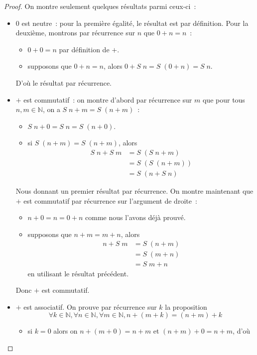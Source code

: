 \begin{proof}
  On montre seulement quelques résultats parmi ceux-ci~:
  \begin{itemize}
  \item $0$ est neutre~: pour la première égalité, le résultat est par
    définition. Pour la deuxième, montrons par récurrence sur $n$ que
    $0+n = n$~:
    \begin{itemize}
    \item $0 + 0 = n$ par définition de $+$.
    \item supposons que $0+n = n$, alors $0+S\;n = S\;(0+n) = S\;n$.
    \end{itemize}
    D'où le résultat par récurrence.
  \item $+$ est commutatif~: on montre d'abord par récurrence sur $m$ que pour
    tous $n,m\in\mathbb N$, on a $S\;n+m = S\;(n+m)$~:
    \begin{itemize}
    \item $S\;n+0=S\;n = S\;(n+0)$.
    \item si $S\;(n+m) = S\;(n+m)$, alors
      \begin{align*}
        S\;n+S\;m &= S\;(S\;n+m)\\
        &= S\;(S\;(n+m))\\
        &= S\;(n+S\;n)
      \end{align*}
    \end{itemize}
    Nous donnant un premier résultat par récurrence. On montre maintenant que
    $+$ est commutatif par récurrence sur l'argument de droite~:
    \begin{itemize}
    \item $n+0 = n = 0+n$ comme nous l'avons déjà prouvé.
    \item supposons que $n+m = m+n$, alors
      \begin{align*}
        n + S\;m &= S\;(n+m)\\
        &= S\;(m+n)\\
        &= S\;m + n
      \end{align*}
      en utilisant le résultat précédent.
    \end{itemize}
    Donc $+$ est commutatif.
  \item $+$ est associatif. On prouve par récurrence sur $k$ la proposition
    \[\forall k\in\mathbb N,\forall n\in\mathbb N,\forall m\in \mathbb N,
    n + (m + k) = (n + m) + k\]
    \begin{itemize}
    \item si $k = 0$ alors on $n + (m + 0) = n + m$ et $(n+m)+0=n+m$, d'où

\end{itemize}
\end{itemize}
\end{proof}
